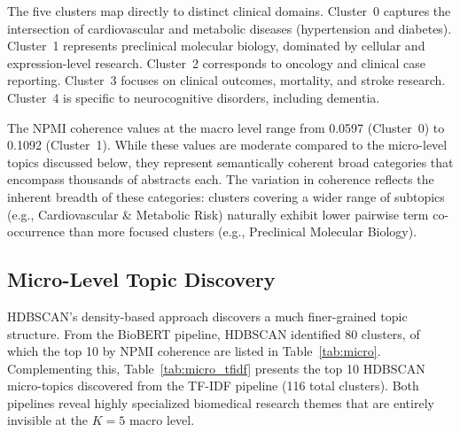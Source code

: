 \documentclass[a4paper,fleqn]{cas-dc}
\begin{document}
The five clusters map directly to distinct clinical domains. Cluster~0 captures the intersection of cardiovascular and metabolic diseases (hypertension and diabetes). Cluster~1 represents preclinical molecular biology, dominated by cellular and expression-level research. Cluster~2 corresponds to oncology and clinical case reporting. Cluster~3 focuses on clinical outcomes, mortality, and stroke research. Cluster~4 is specific to neurocognitive disorders, including dementia.

The NPMI coherence values at the macro level range from 0.0597 (Cluster~0) to 0.1092 (Cluster~1). While these values are moderate compared to the micro-level topics discussed below, they represent semantically coherent broad categories that encompass thousands of abstracts each. The variation in coherence reflects the inherent breadth of these categories: clusters covering a wider range of subtopics (e.g., Cardiovascular \& Metabolic Risk) naturally exhibit lower pairwise term co-occurrence than more focused clusters (e.g., Preclinical Molecular Biology).

\subsection{Micro-Level Topic Discovery}

HDBSCAN's density-based approach discovers a much finer-grained topic structure. From the BioBERT pipeline, HDBSCAN identified 80 clusters, of which the top 10 by NPMI coherence are listed in Table~\ref{tab:micro}. Complementing this, Table~\ref{tab:micro_tfidf} presents the top 10 HDBSCAN micro-topics discovered from the TF-IDF pipeline (116 total clusters). Both pipelines reveal highly specialized biomedical research themes that are entirely invisible at the $K=5$ macro level.
\end{document}

